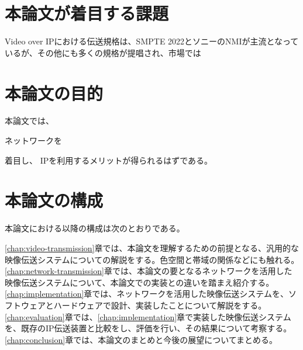 \section{本論文が着目する課題}
Video over IPにおける伝送規格は、SMPTE 2022とソニーのNMIが主流となっている\cite{kodera-interbee2016}が、その他にも多くの規格が提唱され、市場では

\section{本論文の目的}
本論文では、

ネットワークを
\cite{ntt-jgn-4k}

着目し、
IPを利用するメリットが得られるはずである。

\section{本論文の構成}
本論文における以降の構成は次のとおりである。

\ref{chap:video-transmission}章では、本論文を理解するための前提となる、汎用的な映像伝送システムについての解説をする。色空間と帯域の関係などにも触れる。
\ref{chap:network-transmission}章では、本論文の要となるネットワークを活用した映像伝送システムについて、本論文での実装との違いを踏まえ紹介する。
\ref{chap:implementation}章では、ネットワークを活用した映像伝送システムを、ソフトウェアとハードウェアで設計、実装したことについて解説をする。
\ref{chap:evaluation}章では、\ref{chap:implementation}章で実装した映像伝送システムを、既存のIP伝送装置と比較をし、評価を行い、その結果について考察する。
\ref{chap:conclusion}章では、本論文のまとめと今後の展望についてまとめる。
